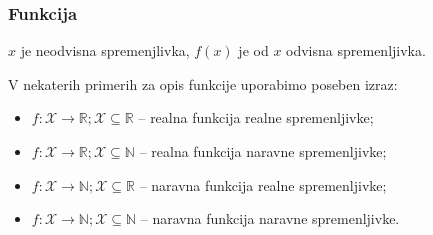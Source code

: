         \begin{frame}
            \frametitle{Funkcija}




            \begin{block}{}
                $x$ je neodvisna spremenjlivka, $f(x)$ je od $x$ odvisna spremenljivka.
            \end{block}

        \end{frame}

        
        \begin{frame}
            
            \begin{block}{}
                V nekaterih primerih za opis funkcije uporabimo poseben izraz:
                \begin{itemize}
                    \item $f:\mathcal{X}\to\mathbb{R}; \mathcal{X}\subseteq\mathbb{R}$ -- realna funkcija realne spremenljivke;
                    \item $f:\mathcal{X}\to\mathbb{R}; \mathcal{X}\subseteq\mathbb{N}$ -- realna funkcija naravne spremenljivke;
                    \item $f:\mathcal{X}\to\mathbb{N}; \mathcal{X}\subseteq\mathbb{R}$ -- naravna funkcija realne spremenljivke;
                    \item $f:\mathcal{X}\to\mathbb{N}; \mathcal{X}\subseteq\mathbb{N}$ -- naravna funkcija naravne spremenljivke.
                \end{itemize}
            \end{block}
        \end{frame}

